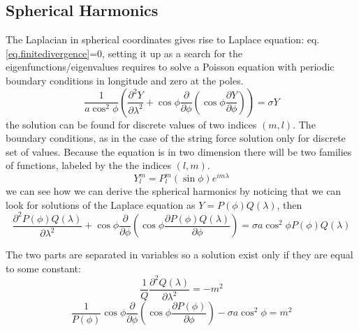
\subsection{Spherical Harmonics}
The Laplacian in spherical coordinates gives rise to Laplace equation: eq.\ref{eq.finitedivergence}=0, setting it up as a search for the eigenfunctions/eigenvalues requires to solve a Poisson equation with periodic boundary conditions in longitude and zero at the poles.
\begin{equation}\label{eq.sphericalhar}
	\frac{1}{a\cos^2\phi}\left(\frac{\partial^2Y}{\partial\lambda^2}+\cos\phi\frac{\partial}{\partial\phi}\left(\cos\phi\frac{\partial Y}{\partial\phi}\right)\right)=\sigma Y
\end{equation}
the solution can be found for discrete values of two indices $(m,l)$.
The boundary conditions, as in the case of the string force solution only for
discrete set of values. Because the equation is in two dimension there will
be two families of functions, labeled by the the indices $(l,m)$.
\begin{equation}
	Y_l^m=P_l^m(\sin\phi)e^{im\lambda}
\end{equation}
we can see how we can derive the spherical harmonics by noticing that we can look for solutions of the Laplace equation as $Y=P(\phi)Q(\lambda)$, then
$$\frac{\partial^2P(\phi)Q(\lambda)}{\partial\lambda^2}+\cos\phi\frac{\partial}{\partial\phi}\left(\cos\phi\frac{\partial P(\phi)Q(\lambda)}{\partial\phi}\right)=\sigma a\cos^2\phi P(\phi)Q(\lambda)$$


The two parts are separated in variables so a solution exist
only if they are equal to some constant:
$$\frac{1}{Q}\frac{\partial^2Q(\lambda)}{\partial\lambda^2}=-m^2$$
$$\frac{1}{P(\phi)}\cos\phi\frac{\partial}{\partial\phi}\left(\cos\phi\frac{\partial P(\phi)}{\partial\phi}\right)-\sigma a\cos^2\phi=m^2$$

